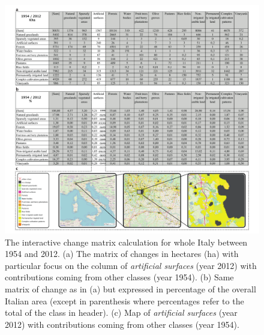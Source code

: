 \documentclass[APA,LATO1COL,doublespace]{WileyNJD-v2}
\begin{document}
\begin{figure}[t] %
    \centerline{\includegraphics[width=450pt]{04_caso_nazionale}}
    \caption{ The interactive change matrix calculation for whole Italy between 1954 and 2012.
    (a) The matrix of changes in hectares (ha) with particular focus on the column of \textit{artificial surfaces} (year 2012) with contributions coming from other classes (year 1954).
    (b) Same matrix of change as in (a) but expressed in percentage of the overall Italian area (except in parenthesis where percentages refer to the total of the class in header).
    (c) Map of \textit{artificial surfaces} (year 2012) with contributions coming from other classes (year 1954).
    } \label{fig:caseIT}
\end{figure}
\end{document}
